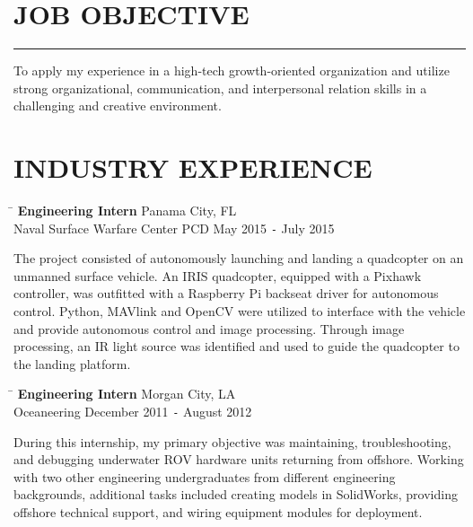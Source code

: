 \documentclass{res}
\begin{document}
 


\address{\bf  PRESENT ADDRESS\\Southlake Avenue\\Baton Rouge, LA 70804}
\address{\bf PERMANENT ADDRESS \\Smith Drive\\  Walker , LA 70785}
                                  
\begin{resume}

\section{JOB OBJECTIVE}  
\rule{\textwidth}{1pt}
    To apply my experience in a high-tech growth-oriented organization and utilize strong organizational, communication, and interpersonal relation skills in a challenging and creative environment.      
    
\section{INDUSTRY EXPERIENCE}
\vspace{-0.1in}	
\begin{tabbing}
	\hspace{4.652in}\= \kill %
	{\bf Engineering Intern} \> \hspace{0.3in}Panama City, FL  \\  
	 Naval Surface Warfare Center PCD \> May 2015 \texttt{-} July 2015	
\end{tabbing}\vspace{-20pt}      %
The project consisted of autonomously launching and landing a quadcopter on an unmanned surface vehicle. An IRIS quadcopter, equipped with a Pixhawk controller, was outfitted with a Raspberry Pi backseat driver for autonomous control. Python, MAVlink and OpenCV were utilized to interface with the vehicle and provide autonomous control and image processing. Through image processing, an IR light source was identified and used to guide the quadcopter to the landing platform.
\begin{tabbing}
	\hspace{4.155in}\=  \kill %
	{\bf Engineering Intern} \> \hspace{0.815in}Morgan City, LA \\
	Oceaneering \>December 2011 \texttt{-} August 2012
\end{tabbing}\vspace{-20pt}
During this internship, my primary objective was maintaining, troubleshooting, and debugging underwater ROV hardware units returning from offshore. Working with two other engineering undergraduates from different engineering backgrounds, additional tasks included creating models in SolidWorks, providing offshore technical support, and wiring equipment modules for deployment.


\end{resume}
\end{document}
